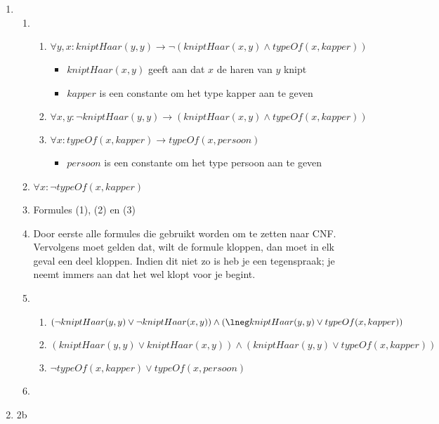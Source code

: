 \documentclass[]{article}
\begin{document}
  \begin{enumerate}[a]
    \item
    \begin{enumerate}[i]
      \item
      \begin{enumerate}[1]
        \item $\forall y, x : kniptHaar(y,y) \longrightarrow \neg (kniptHaar(x,y) \land typeOf(x,kapper)) $
        \begin{itemize}
          \item $kniptHaar(x,y)$ geeft aan dat $x$ de haren van $y$ knipt
          \item $kapper$ is een constante om het type kapper aan te geven
        \end{itemize}
        \item $\forall x,y : \neg kniptHaar(y,y) \longrightarrow (kniptHaar(x,y) \land typeOf(x,kapper)) $
        \item $\forall x: typeOf(x,kapper) \longrightarrow typeOf(x,persoon)$
        \begin{itemize}
          \item $persoon$ is een constante om het type persoon aan te geven
        \end{itemize}
      \end{enumerate}
      \item $\forall x: \neg typeOf(x,kapper)$
      \item Formules (1), (2) en (3)
      \item Door eerste alle formules die gebruikt worden om te zetten naar CNF. Vervolgens moet gelden dat, wilt de formule kloppen, dan moet in elk geval een deel kloppen.
      Indien dit niet zo is heb je een tegenspraak; je neemt immers aan dat het wel klopt voor je begint.
      \item
      \begin{enumerate}[1]
        \item $ (\neg kniptHaar(y,y) \lor \lnot kniptHaar(x,y)) \land (\lneg kniptHaar(y,y) \lor typeOf(x,kapper)) $
        \item $ (kniptHaar(y,y) \lor kniptHaar(x, y)) \land (kniptHaar(y,y) \lor typeOf(x,kapper))$
        \item $ \neg typeOf(x,kapper) \lor typeOf(x,persoon) $
      \end{enumerate}
      \item
    \end{enumerate}
    \item 2b

  \end{enumerate}
\end{document}
